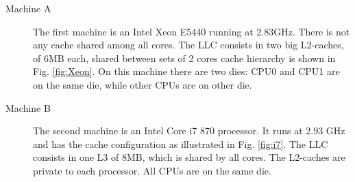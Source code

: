 \begin{figure}[htbp]
 \centering%
  \qquad\qquad
 \caption{}
\end{figure}

\begin{description}
\item[Machine A] The first machine is an Intel Xeon E5440 running at 2.83GHz. There is not any cache shared among all cores. The LLC consists in two 
big L2-caches, of 6MB each, shared between sets of 2 cores cache hierarchy is shown in Fig. \ref{fig:Xeon}. On this machine there are two dies: CPU0 and 
CPU1 are on the same die, while other CPUs are on other die.

\item[Machine B] The second machine is an Intel Core i7 870 processor. It runs at 2.93 GHz and has the cache configuration as illustrated in Fig. 
\ref{fig:i7}. The LLC consists in one L3 of 8MB, which is shared by all cores. The L2-caches are private to each processor. All CPUs are on the same die.

\end{description}

